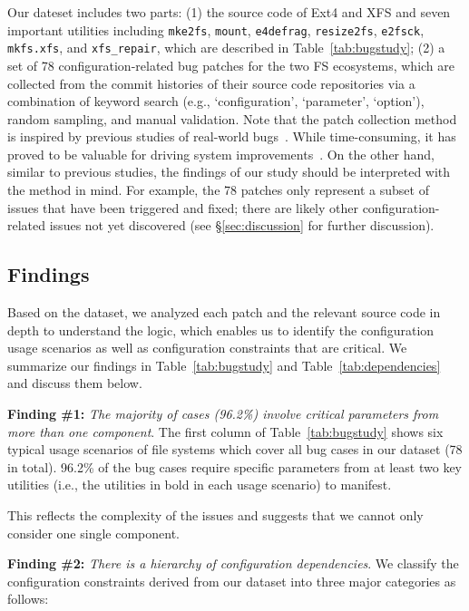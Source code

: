 Our dateset includes two parts: (1) the source code of Ext4 and XFS and
seven important utilities including \texttt{mke2fs}, \texttt{mount}, \texttt{e4defrag}, \texttt{resize2fs}, \texttt{e2fsck}, \texttt{mkfs.xfs}, and \texttt{xfs\_repair}, which are described in Table~\ref{tab:bugstudy};
(2) a set of 78 configuration-related bug patches for the two FS ecosystems, 
which are collected from the commit histories of their source code repositories via a combination of keyword search (e.g., ‘configuration’, ‘parameter’, ‘option’), random sampling, and manual validation. 
Note that the patch collection method is inspired by previous studies of real-world bugs~\cite{Lu-FAST13-FS,lu2008learning,Duo-SYSTOR21}. While time-consuming, it has proved to be valuable for driving system improvements~\cite{Lu-FAST13-FS,lu2008learning}.
On the other hand, similar to previous studies, the findings of our study should be interpreted with the method in
mind. For example, the 78 patches only represent a subset of issues that have been triggered and fixed; there are likely  other configuration-related issues  not yet discovered (see \S\ref{sec:discussion} for further discussion). 

\vspace{-0.05in}
\subsection{Findings}
\label{sec:findings}
Based on the   dataset,  we analyzed  each patch 
and the relevant source code in depth to understand the logic,
which enables us to identify the configuration usage scenarios  as well as  configuration constraints that are critical. We summarize our findings in Table~\ref{tab:bugstudy} and Table~\ref{tab:dependencies} and discuss them below. 

\vspace{0.1in}
\noindent
\textbf{Finding \#1:} \textit{The majority of cases (96.2\%) involve critical  parameters from more than one component}.  
The first column of Table~\ref{tab:bugstudy} shows six typical usage scenarios of file systems which cover all bug cases in our dataset (78 in total). 96.2\% of the bug cases require specific parameters from at least two key utilities (i.e., the utilities in bold in each usage scenario) to manifest.
 
This reflects the complexity of the  issues  and suggests that we cannot only consider one single component.

\noindent
\textbf{Finding \#2:} \textit{There is a hierarchy of configuration dependencies}.
We classify the configuration constraints derived from our dataset into three major categories as follows: 


